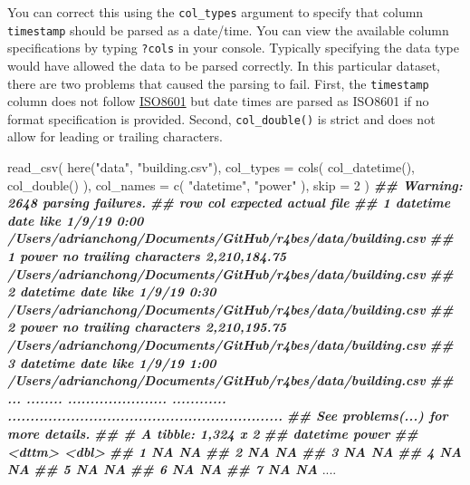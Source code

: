 \documentclass[
]{book}
\newenvironment{Shaded}{\begin{snugshade}}{\end{snugshade}}
\newcommand{\AttributeTok}[1]{\textcolor[rgb]{0.77,0.63,0.00}{#1}}
\newcommand{\DecValTok}[1]{\textcolor[rgb]{0.00,0.00,0.81}{#1}}
\newcommand{\DocumentationTok}[1]{\textcolor[rgb]{0.56,0.35,0.01}{\textbf{\textit{#1}}}}
\newcommand{\FunctionTok}[1]{\textcolor[rgb]{0.00,0.00,0.00}{#1}}
\newcommand{\NormalTok}[1]{#1}
\newcommand{\StringTok}[1]{\textcolor[rgb]{0.31,0.60,0.02}{#1}}
\begin{document}
You can correct this using the \texttt{col\_types} argument to specify that column \texttt{timestamp} should be parsed as a date/time. You can view the available column specifications by typing \texttt{?cols} in your console. Typically specifying the data type would have allowed the data to be parsed correctly. In this particular dataset, there are two problems that caused the parsing to fail. First, the \texttt{timestamp} column does not follow \href{https://en.wikipedia.org/wiki/ISO_8601}{ISO8601} but date times are parsed as ISO8601 if no format specification is provided. Second, \texttt{col\_double()} is strict and does not allow for leading or trailing characters.

\begin{Shaded}
\begin{Highlighting}[]
\FunctionTok{read\_csv}\NormalTok{(}
  \FunctionTok{here}\NormalTok{(}\StringTok{"data"}\NormalTok{, }\StringTok{"building.csv"}\NormalTok{),}
  \AttributeTok{col\_types =} \FunctionTok{cols}\NormalTok{(}
    \FunctionTok{col\_datetime}\NormalTok{(),}
    \FunctionTok{col\_double}\NormalTok{()}
\NormalTok{  ),}
  \AttributeTok{col\_names =} \FunctionTok{c}\NormalTok{(}
    \StringTok{"datetime"}\NormalTok{,}
    \StringTok{"power"}
\NormalTok{  ),}
  \AttributeTok{skip =} \DecValTok{2}
\NormalTok{)}
\DocumentationTok{\#\# Warning: 2648 parsing failures.}
\DocumentationTok{\#\# row      col               expected       actual                                                          file}
\DocumentationTok{\#\#   1 datetime date like              1/9/19 0:00  \textquotesingle{}/Users/adrianchong/Documents/GitHub/r4bes/data/building.csv\textquotesingle{}}
\DocumentationTok{\#\#   1 power    no trailing characters 2,210,184.75 \textquotesingle{}/Users/adrianchong/Documents/GitHub/r4bes/data/building.csv\textquotesingle{}}
\DocumentationTok{\#\#   2 datetime date like              1/9/19 0:30  \textquotesingle{}/Users/adrianchong/Documents/GitHub/r4bes/data/building.csv\textquotesingle{}}
\DocumentationTok{\#\#   2 power    no trailing characters 2,210,195.75 \textquotesingle{}/Users/adrianchong/Documents/GitHub/r4bes/data/building.csv\textquotesingle{}}
\DocumentationTok{\#\#   3 datetime date like              1/9/19 1:00  \textquotesingle{}/Users/adrianchong/Documents/GitHub/r4bes/data/building.csv\textquotesingle{}}
\DocumentationTok{\#\# ... ........ ...................... ............ .............................................................}
\DocumentationTok{\#\# See problems(...) for more details.}
\DocumentationTok{\#\# \# A tibble: 1,324 x 2}
\DocumentationTok{\#\#    datetime            power}
\DocumentationTok{\#\#    \textless{}dttm\textgreater{}              \textless{}dbl\textgreater{}}
\DocumentationTok{\#\#  1 NA                     NA}
\DocumentationTok{\#\#  2 NA                     NA}
\DocumentationTok{\#\#  3 NA                     NA}
\DocumentationTok{\#\#  4 NA                     NA}
\DocumentationTok{\#\#  5 NA                     NA}
\DocumentationTok{\#\#  6 NA                     NA}
\DocumentationTok{\#\#  7 NA                     NA}
\NormalTok{....}
\end{Highlighting}
\end{Shaded}
\end{document}
